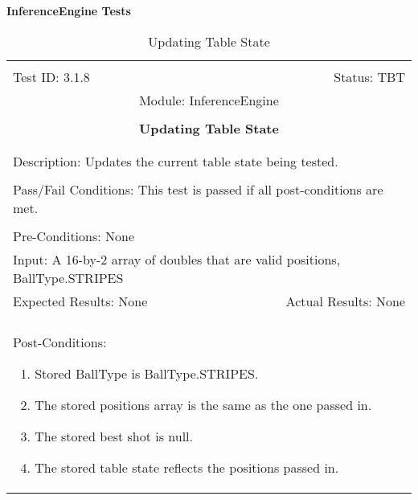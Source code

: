 \documentclass[titlepage]{article}
\begin{document}
\large{\textbf{InferenceEngine Tests}}
\begin{center}%
\begin{table}
\begin{tabular}{|l r|}\hline&\\[-2mm]
	Test ID: 3.1.8	&Status: TBT\\[-3mm]
	\multicolumn{2}{|c|}{Module: InferenceEngine}\\&\\
	\multicolumn{2}{|c|}{\textbf{\large{Updating Table State}}}\\&\\\hline&\\[-3mm]
	\multicolumn{2}{|p{\textwidth}|}{Description: Updates the current table state being tested.}\\[1mm]\hline&\\[-3mm]
	\multicolumn{2}{|p{\textwidth}|}{Pass/Fail Conditions: This test is passed if all post-conditions are met.}\\[1mm]\hline&\\[-3mm]
	\multicolumn{2}{|p{\textwidth}|}{Pre-Conditions: None}\\[4mm]
	\multicolumn{2}{|p{\textwidth}|}{Input: A 16-by-2 array of doubles that are valid positions, BallType.STRIPES}\\[2mm]\hline
	\multicolumn{1}{|p{0.49\textwidth}}{Expected Results: None}	&\multicolumn{1}{|p{0.45\textwidth}|}{Actual Results: None}\\\hline&\\[-3mm]
	\multicolumn{2}{|p{\textwidth}|}{Post-Conditions: \begin{enumerate}\item Stored BallType is BallType.STRIPES. \item The stored positions array is the same as the one passed in. \item The stored best shot is null. \item The stored table state reflects the positions passed in.\end{enumerate}}\\\hline
\end{tabular}
\caption{Updating Table State}
\end{table}
\end{center}
\end{document}
